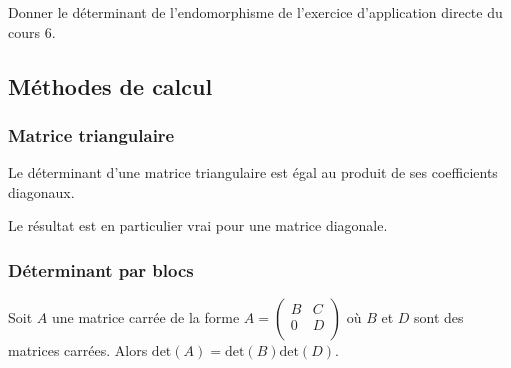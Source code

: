 \documentclass[a4paper,10pt]{report}
\begin{document}
\begin{ApplicationDirecte} Donner le déterminant de l'endomorphisme de l'exercice d'application directe du cours $6$.
\end{ApplicationDirecte}

\subsection{Méthodes de calcul}
\subsubsection{Matrice triangulaire}

\begin{Proposition}{} Le déterminant d'une matrice triangulaire est égal au produit de ses coefficients diagonaux.
\end{Proposition}

\begin{Remarque}{} Le résultat est en particulier vrai pour une matrice diagonale.
\end{Remarque}

\subsubsection{Déterminant par blocs}

\begin{Proposition}{} Soit $A$ une matrice carrée de la forme $A = \begin{pmatrix}
B & C \\
0 & D \\
\end{pmatrix}$ où $B$ et $D$ sont des matrices carrées. Alors \newline $\textrm{det}(A)= \textrm{det}(B) \textrm{det}(D)$.
\end{Proposition}
\end{document}
